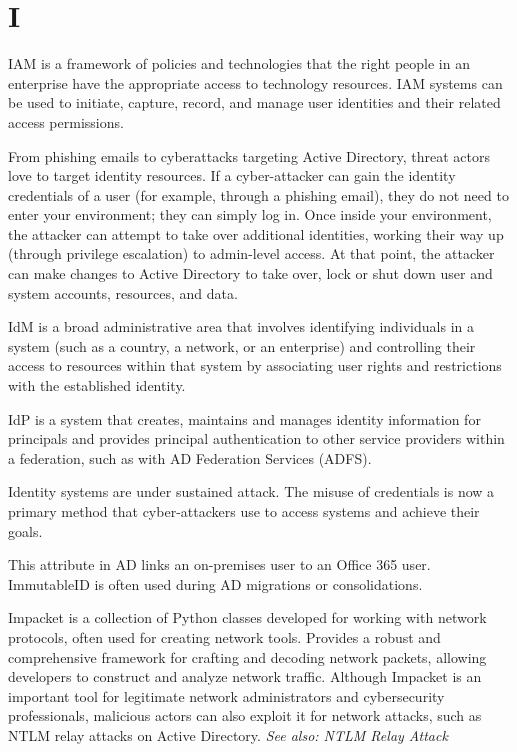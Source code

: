 \section*{I}
 IAM is a framework of policies and technologies that the right people in an enterprise have the appropriate access to technology resources. IAM systems can be used to initiate, capture, record, and manage user identities and their related access permissions.

 From phishing emails to cyberattacks targeting Active Directory, threat actors love to target identity resources. If a cyber-attacker can gain the identity credentials of a user (for example, through a phishing email), they do not need to enter your environment; they can simply log in. Once inside your environment, the attacker can attempt to take over additional identities, working their way up (through privilege escalation) to admin-level access. At that point, the attacker can make changes to Active Directory to take over, lock or shut down user and system accounts, resources, and data.

 IdM is a broad administrative area that involves identifying individuals in a system (such as a country, a network, or an enterprise) and controlling their access to resources within that system by associating user rights and restrictions with the established identity.

 IdP is a system that creates, maintains and manages identity information for principals and provides principal authentication to other service providers within a federation, such as with AD Federation Services (ADFS).

 Identity systems are under sustained attack. The misuse of credentials is now a primary method that cyber-attackers use to access systems and achieve their goals.

 This attribute in AD links an on-premises user to an Office 365 user. ImmutableID is often used during AD migrations or consolidations.

 Impacket is a collection of Python classes developed for working with network protocols, often used for creating network tools. Provides a robust and comprehensive framework for crafting and decoding network packets, allowing developers to construct and analyze network traffic. Although Impacket is an important tool for legitimate network administrators and cybersecurity professionals, malicious actors can also exploit it for network attacks, such as NTLM relay attacks on Active Directory.
\textit{See also: NTLM Relay Attack}

